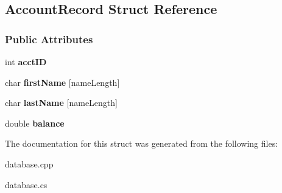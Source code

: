 \hypertarget{struct_account_record}{}\subsection{Account\+Record Struct Reference}
\label{struct_account_record}
\subsubsection*{Public Attributes}
\begin{DoxyCompactItemize}
\item 
int {\bfseries acct\+ID}\hypertarget{struct_account_record_a587aa92adcd387d37427cd19c69e5932}{}\label{struct_account_record_a587aa92adcd387d37427cd19c69e5932}

\item 
char {\bfseries first\+Name} \mbox{[}name\+Length\mbox{]}\hypertarget{struct_account_record_a4ba463ed92b46c3ec07f7904001c57e2}{}\label{struct_account_record_a4ba463ed92b46c3ec07f7904001c57e2}

\item 
char {\bfseries last\+Name} \mbox{[}name\+Length\mbox{]}\hypertarget{struct_account_record_a1d0fe60d57c25aec63b4b2b8008c1fcc}{}\label{struct_account_record_a1d0fe60d57c25aec63b4b2b8008c1fcc}

\item 
double {\bfseries balance}\hypertarget{struct_account_record_a7de857c68a45702a0c1c4720b4570c2a}{}\label{struct_account_record_a7de857c68a45702a0c1c4720b4570c2a}

\end{DoxyCompactItemize}


The documentation for this struct was generated from the following files\+:\begin{DoxyCompactItemize}
\item 
database.\+cpp\item 
database.\+cs\end{DoxyCompactItemize}
